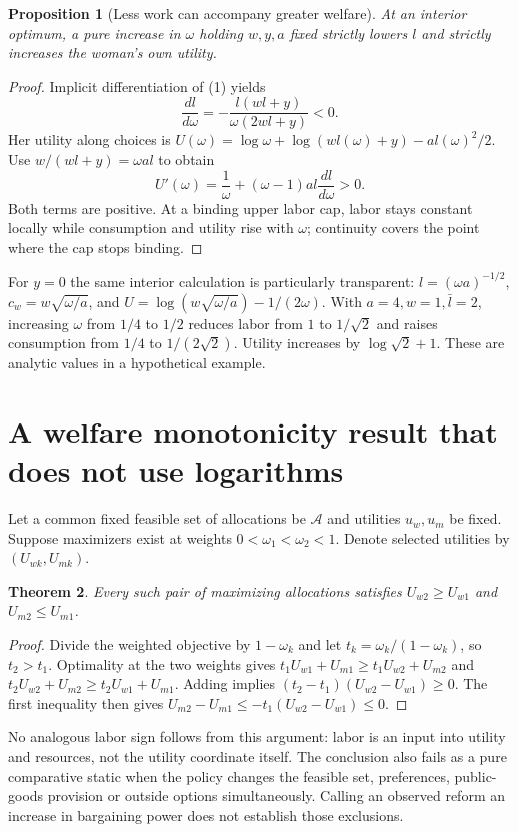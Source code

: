 \documentclass[11pt]{article}
\newtheorem{theorem}{Theorem}
\newtheorem{proposition}[theorem]{Proposition}
\theoremstyle{definition}
\begin{document}
\begin{proposition}[Less work can accompany greater welfare]
At an interior optimum, a pure increase in $\omega$ holding $w,y,a$ fixed
strictly lowers $l$ and strictly increases the woman's own utility.
\end{proposition}
\begin{proof}
Implicit differentiation of (1) yields
\[
 \frac{dl}{d\omega}=-\frac{l(wl+y)}{\omega(2wl+y)}<0.
\]
Her utility along choices is
$U(\omega)=\log\omega+\log(wl(\omega)+y)-a l(\omega)^2/2$.
Use $w/(wl+y)=\omega a l$ to obtain
\[
 U'(\omega)=\frac1\omega+(\omega-1)a l\frac{dl}{d\omega}>0.
\]
Both terms are positive. At a binding upper labor cap, labor stays constant
locally while consumption and utility rise with $\omega$; continuity covers
the point where the cap stops binding.
\end{proof}
For $y=0$ the same interior calculation is particularly transparent:
$l=(\omega a)^{-1/2}$,
$c_w=w\sqrt{\omega/a}$, and
$U=\log(w\sqrt{\omega/a})-1/(2\omega)$.
With $a=4,w=1,\bar l=2$, increasing $\omega$ from $1/4$ to $1/2$
reduces labor from $1$ to $1/\sqrt2$ and raises consumption from $1/4$
to $1/(2\sqrt2)$. Utility increases by
$\log\sqrt2+1$. These are analytic values in a hypothetical example.

\section*{A welfare monotonicity result that does not use logarithms}
Let a common fixed feasible set of allocations be $\mathcal A$ and utilities
$u_w,u_m$ be fixed. Suppose maximizers exist at weights
$0<\omega_1<\omega_2<1$. Denote selected utilities by $(U_{wk},U_{mk})$.
\begin{theorem}
Every such pair of maximizing allocations satisfies
$U_{w2}\ge U_{w1}$ and $U_{m2}\le U_{m1}$.
\end{theorem}
\begin{proof}
Divide the weighted objective by $1-\omega_k$ and let
$t_k=\omega_k/(1-\omega_k)$, so $t_2>t_1$.
Optimality at the two weights gives
$t_1U_{w1}+U_{m1}\ge t_1U_{w2}+U_{m2}$ and
$t_2U_{w2}+U_{m2}\ge t_2U_{w1}+U_{m1}$.
Adding implies $(t_2-t_1)(U_{w2}-U_{w1})\ge0$.
The first inequality then gives
$U_{m2}-U_{m1}\le-t_1(U_{w2}-U_{w1})\le0$.
\end{proof}
No analogous labor sign follows from this argument: labor is an input into
utility and resources, not the utility coordinate itself. The conclusion also
fails as a pure comparative static when the policy changes the feasible set,
preferences, public-goods provision or outside options simultaneously. Calling
an observed reform an increase in bargaining power does not establish those
exclusions.
\end{document}
